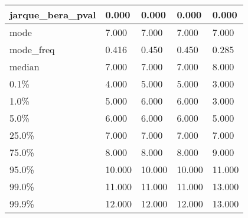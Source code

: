 \begin{table}[H]
\begin{tabular}{|l|m{10em}|m{10em}|m{10em}|m{10em}|}
\hline jarque\_bera\_pval & 0.000 & 0.000 & 0.000 & 0.000 \\
\hline mode & 7.000 & 7.000 & 7.000 & 7.000 \\
\hline mode\_freq & 0.416 & 0.450 & 0.450 & 0.285 \\
\hline median & 7.000 & 7.000 & 7.000 & 8.000 \\
\hline 0.1\% & 4.000 & 5.000 & 5.000 & 3.000 \\
\hline 1.0\% & 5.000 & 6.000 & 6.000 & 3.000 \\
\hline 5.0\% & 6.000 & 6.000 & 6.000 & 5.000 \\
\hline 25.0\% & 7.000 & 7.000 & 7.000 & 7.000 \\
\hline 75.0\% & 8.000 & 8.000 & 8.000 & 9.000 \\
\hline 95.0\% & 10.000 & 10.000 & 10.000 & 11.000 \\
\hline 99.0\% & 11.000 & 11.000 & 11.000 & 13.000 \\
\hline 99.9\% & 12.000 & 12.000 & 12.000 & 13.000 \\
\hline
\end{tabular}
\end{table}
